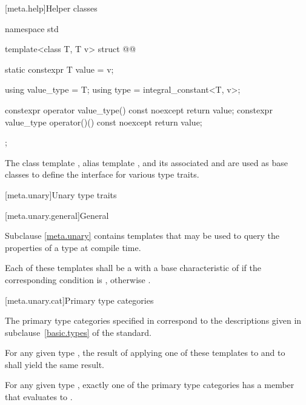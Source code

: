 [meta.help]{Helper classes}

%
\begin{codeblock}
namespace std {
  template<class T, T v> struct @@ {
    static constexpr T value = v;

    using value_type = T;
    using type = integral_constant<T, v>;

    constexpr operator value_type() const noexcept { return value; }
    constexpr value_type operator()() const noexcept { return value; }
  };
}
\end{codeblock}

%
%
%
\pnum
The class template ,
alias template , and
its associated 
 and 
are used as base classes to define
the interface for various type traits.

[meta.unary]{Unary type traits}

[meta.unary.general]{General}

\pnum
Subclause \ref{meta.unary} contains templates that may be used to query the
properties of a type at compile time.

\pnum
Each of these templates shall be a
with a base characteristic of
 if the corresponding condition is , otherwise
.

[meta.unary.cat]{Primary type categories}

\pnum
The primary type categories specified in 
correspond to the descriptions given in
subclause~\ref{basic.types} of the \Cpp{} standard.

\pnum
For any given type , the result of applying one of these templates to
 and to \cv{}~ shall yield the same result.

\pnum
\begin{note}
For any given type , exactly one of the primary type categories
has a  member that evaluates to .
\end{note}

